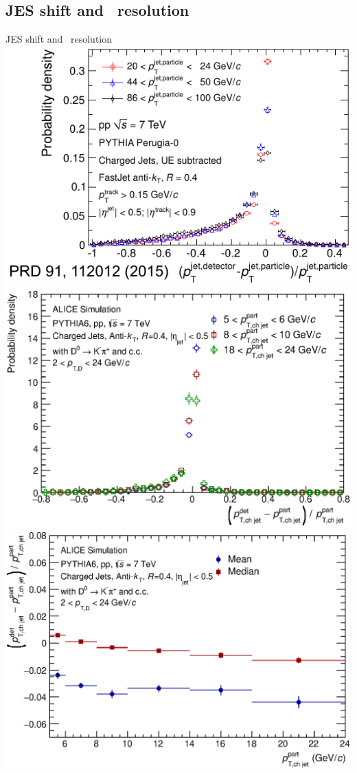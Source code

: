 \documentclass{beamer}
\begin{document}
\subsection{JES shift and \pt\ resolution}
\begin{frame}{JES shift and \pt\ resolution}
\includegraphics[width=.3\paperwidth]{img/ALICE_JetRes}\quad
\includegraphics[width=.3\paperwidth]{img/HQ16_Simulation_DetectorResponse}\\
\includegraphics[width=.3\paperwidth]{img/HQ16_Simulation_EnergyScaleShift}\quad

\end{frame}
\end{document}
